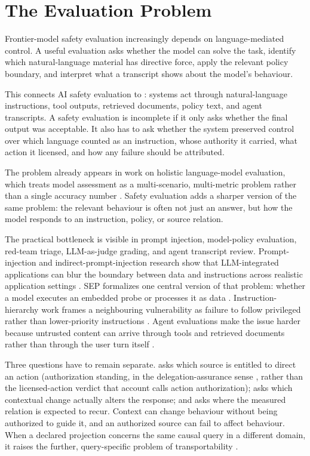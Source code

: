 \section{The Evaluation Problem}
\label{sec:evaluation-problem}

Frontier-model safety evaluation increasingly depends on language-mediated control. A useful evaluation asks whether the model can solve the task, identify which natural-language material has directive force, apply the relevant policy boundary, and interpret what a transcript shows about the model's behaviour.

This connects AI safety evaluation to : systems act through natural-language instructions, tool outputs, retrieved documents, policy text, and agent transcripts. A safety evaluation is incomplete if it only asks whether the final output was acceptable. It also has to ask whether the system preserved control over which language counted as an instruction, whose authority it carried, what action it licensed, and how any failure should be attributed.

The problem already appears in work on holistic language-model evaluation, which treats model assessment as a multi-scenario, multi-metric problem rather than a single accuracy number \parencite{liang2022holistic}. Safety evaluation adds a sharper version of the same problem: the relevant behaviour is often not just an answer, but how the model responds to an instruction, policy, or source relation.

The practical bottleneck is visible in prompt injection, model-policy evaluation, red-team triage, LLM-as-judge grading, and agent transcript review. Prompt-injection and indirect-prompt-injection research show that LLM-integrated applications can blur the boundary between data and instructions across realistic application settings \parencite{greshake2023not,yi2025bipia}. SEP formalizes one central version of that problem: whether a model executes an embedded probe or processes it as data \parencite{zverev2025separate}. Instruction-hierarchy work frames a neighbouring vulnerability as failure to follow privileged rather than lower-priority instructions \parencite{wallace2024instruction}. Agent evaluations make the issue harder because untrusted content can arrive through tools and retrieved documents rather than through the user turn itself \parencite{debenedetti2024agentdojo}.

Three questions have to remain separate.  asks which source is entitled to direct an action (authorization standing, in the delegation-assurance sense \parencite{reynolds2026delegationAssurance}, rather than the licensed-action verdict that account calls action authorization);  asks which contextual change actually alters the response; and  asks where the measured relation is expected to recur. Context can change behaviour without being authorized to guide it, and an authorized source can fail to affect behaviour. When a declared projection concerns the same causal query in a different domain, it raises the further, query-specific problem of transportability \parencite{pearlBareinboim2014externalValidity}.

